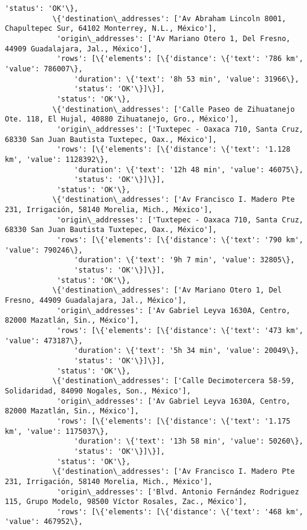 \documentclass[11pt]{article}
\begin{document}
\begin{Verbatim}[commandchars=\\\{\}]
            'status': 'OK'\},
           \{'destination\_addresses': ['Av Abraham Lincoln 8001, Chapultepec Sur, 64102 Monterrey, N.L., México'],
            'origin\_addresses': ['Av Mariano Otero 1, Del Fresno, 44909 Guadalajara, Jal., México'],
            'rows': [\{'elements': [\{'distance': \{'text': '786 km', 'value': 786007\},
                'duration': \{'text': '8h 53 min', 'value': 31966\},
                'status': 'OK'\}]\}],
            'status': 'OK'\},
           \{'destination\_addresses': ['Calle Paseo de Zihuatanejo Ote. 118, El Hujal, 40880 Zihuatanejo, Gro., México'],
            'origin\_addresses': ['Tuxtepec - Oaxaca 710, Santa Cruz, 68330 San Juan Bautista Tuxtepec, Oax., México'],
            'rows': [\{'elements': [\{'distance': \{'text': '1.128 km', 'value': 1128392\},
                'duration': \{'text': '12h 48 min', 'value': 46075\},
                'status': 'OK'\}]\}],
            'status': 'OK'\},
           \{'destination\_addresses': ['Av Francisco I. Madero Pte 231, Irrigación, 58140 Morelia, Mich., México'],
            'origin\_addresses': ['Tuxtepec - Oaxaca 710, Santa Cruz, 68330 San Juan Bautista Tuxtepec, Oax., México'],
            'rows': [\{'elements': [\{'distance': \{'text': '790 km', 'value': 790246\},
                'duration': \{'text': '9h 7 min', 'value': 32805\},
                'status': 'OK'\}]\}],
            'status': 'OK'\},
           \{'destination\_addresses': ['Av Mariano Otero 1, Del Fresno, 44909 Guadalajara, Jal., México'],
            'origin\_addresses': ['Av Gabriel Leyva 1630A, Centro, 82000 Mazatlán, Sin., México'],
            'rows': [\{'elements': [\{'distance': \{'text': '473 km', 'value': 473187\},
                'duration': \{'text': '5h 34 min', 'value': 20049\},
                'status': 'OK'\}]\}],
            'status': 'OK'\},
           \{'destination\_addresses': ['Calle Decimotercera 58-59, Solidaridad, 84090 Nogales, Son., México'],
            'origin\_addresses': ['Av Gabriel Leyva 1630A, Centro, 82000 Mazatlán, Sin., México'],
            'rows': [\{'elements': [\{'distance': \{'text': '1.175 km', 'value': 1175037\},
                'duration': \{'text': '13h 58 min', 'value': 50260\},
                'status': 'OK'\}]\}],
            'status': 'OK'\},
           \{'destination\_addresses': ['Av Francisco I. Madero Pte 231, Irrigación, 58140 Morelia, Mich., México'],
            'origin\_addresses': ['Blvd. Antonio Fernández Rodriguez 115, Grupo Modelo, 98500 Víctor Rosales, Zac., México'],
            'rows': [\{'elements': [\{'distance': \{'text': '468 km', 'value': 467952\},

\end{Verbatim}
\end{document}
